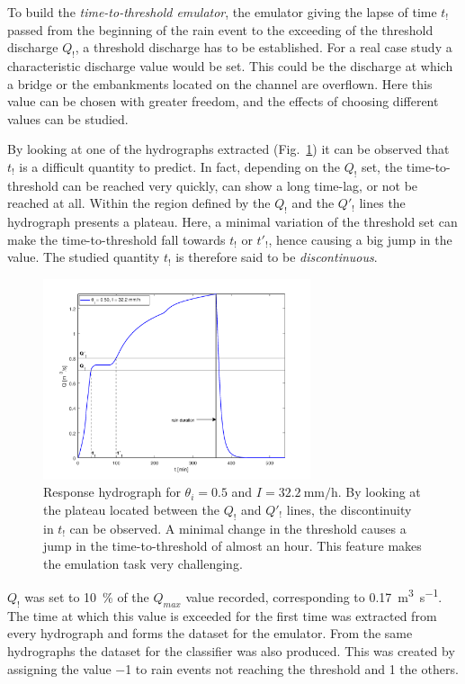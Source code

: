 To build the \emph{time-to-threshold emulator}, the emulator giving the lapse of time $t_!$ passed from the beginning of the rain event to the exceeding of the threshold discharge $Q_!$, a threshold discharge has to be established.
For a real case study a characteristic discharge value would be set.
This could be the discharge at which a bridge or the embankments located on the channel are overflown.
Here this value can be chosen with greater freedom, and the effects of choosing different values can be studied.

By looking at one of the hydrographs extracted (Fig.~\ref{fig:hydrograph}) it can be observed that $t_!$ is a difficult quantity to predict.
In fact, depending on the $Q_!$ set, the time-to-threshold can be reached very quickly, can show a long time-lag, or not be reached at all.
Within the region defined by the $Q_!$ and the $Q'_!$ lines the hydrograph presents a plateau.
Here, a minimal variation of the threshold set can make the time-to-threshold fall towards $t_!$ or $t'_!$, hence causing a big jump in the value.
The studied quantity $t_!$ is therefore said to be \emph{discontinuous}.

\begin{figure}[h]
  \centering
  \includegraphics[width=0.7\textwidth]{Figures/hydrograph.png}
  \caption{Response hydrograph for $\theta_i = \num{0.5}$ and $I = \SI{32.2}{\milli\meter\per\hour}$. By looking at the plateau located between the $Q_!$ and $Q'_!$ lines, the discontinuity in $t_!$ can be observed. A minimal change in the threshold causes a jump in the time-to-threshold of almost an hour. This feature makes the emulation task very challenging.}
  \label{fig:hydrograph}
\end{figure}

$Q_!$ was set to \SI{10}{\percent} of the $Q_{max}$ value recorded, corresponding to \SI{0.17}{\cubic\meter\per\second}.
The time at which this value is exceeded for the first time was extracted from every hydrograph and forms the dataset for the emulator.
From the same hydrographs the dataset for the classifier was also produced.
This was created by assigning the value \num{-1} to rain events not reaching the threshold and \num{1} the others.

